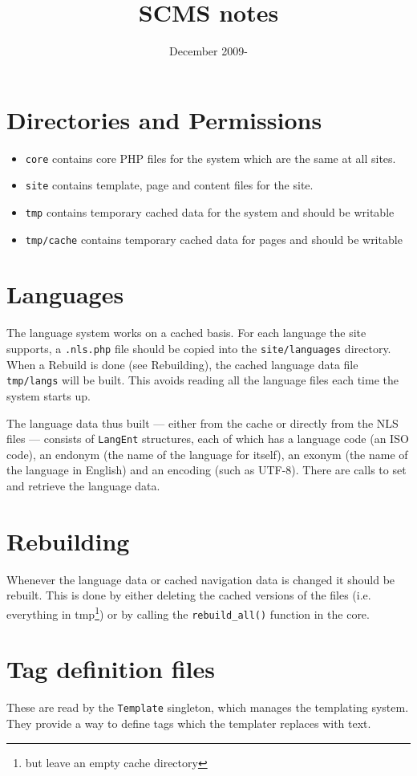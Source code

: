 \documentclass[10pt,twoside,openright]{scrbook}
\title{SCMS notes}
\date{December 2009-}
\begin{document}
\maketitle
\tableofcontents

\section{Directories and Permissions}
\begin{itemize}
\item \texttt{core} contains core PHP files for the system which are the same at all sites.
\item \texttt{site} contains template, page and content files for the site.
\item \texttt{tmp} contains temporary cached data for the system and should be writable
\item \texttt{tmp/cache} contains temporary cached data for pages and should be writable
\end{itemize}

\section{Languages}
The language system works on a cached basis. For each language the site
supports, a \texttt{.nls.php} file should be copied into the \texttt{site/languages}
directory. When a Rebuild is done (see Rebuilding), the cached language data file
\texttt{tmp/langs} will be built. This avoids reading all the language files
each time the system starts up.

The language data thus built --- either from the cache or directly from
the NLS files --- consists of \texttt{LangEnt} structures, each of which
has a language code (an ISO code), an endonym (the name of the language
for itself), an exonym (the name of the language in English) and an
encoding (such as UTF-8). There are calls to set and retrieve the language
data.

\section{Rebuilding}
Whenever the language data or cached navigation data is changed it should
be rebuilt. This is done by either deleting the cached versions of the files
(i.e. everything in tmp\footnote{but leave an empty cache directory}) or by 
calling the \texttt{rebuild\_all()} function in the core.

\section{Tag definition files}
These are read by the \texttt{Template} singleton, which manages the templating
system. They provide a way to define tags which the templater replaces with
text.
\end{document}
